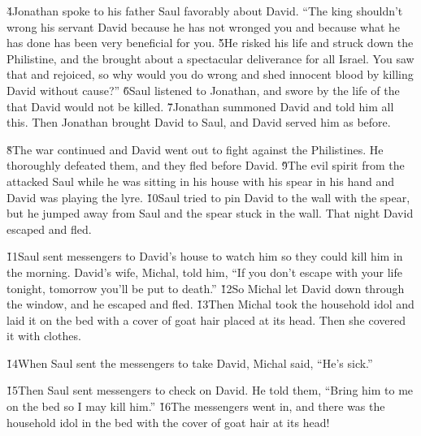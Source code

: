\v{4}Jonathan spoke to his father Saul favorably about David. ``The king shouldn't wrong his servant David because he has not wronged you and because what he has done has been very beneficial for you. \v{5}He risked his life and struck down the Philistine, and the  brought about a spectacular deliverance for all Israel. You saw that and rejoiced, so why would you do wrong and shed innocent blood by killing David without cause?'' \v{6}Saul listened to Jonathan, and swore by the life of the  that David would not be killed. \v{7}Jonathan summoned David and told him all this. Then Jonathan brought David to Saul, and David served him as before.

\v{8}The war continued and David went out to fight against the Philistines. He thoroughly defeated them, and they fled before David. \v{9}The evil spirit from the  attacked Saul while he was sitting in his house with his spear in his hand and David was playing the lyre. \v{10}Saul tried to pin David to the wall with the spear, but he jumped away from Saul and the spear stuck in the wall. That night David escaped and fled.

\v{11}Saul sent messengers to David's house to watch him so they could kill him in the morning. David's wife, Michal, told him, ``If you don't escape with your life tonight, tomorrow you'll be put to death.'' \v{12}So Michal let David down through the window, and he escaped and fled. \v{13}Then Michal took the household idol and laid it on the bed with a cover of goat hair placed at its head. Then she covered it with clothes.

\v{14}When Saul sent the messengers to take David, Michal said, ``He's sick.''

\v{15}Then Saul sent messengers to check on David. He told them, ``Bring him to me on the bed so I may kill him.'' \v{16}The messengers went in, and there was the household idol in the bed with the cover of goat hair at its head!

